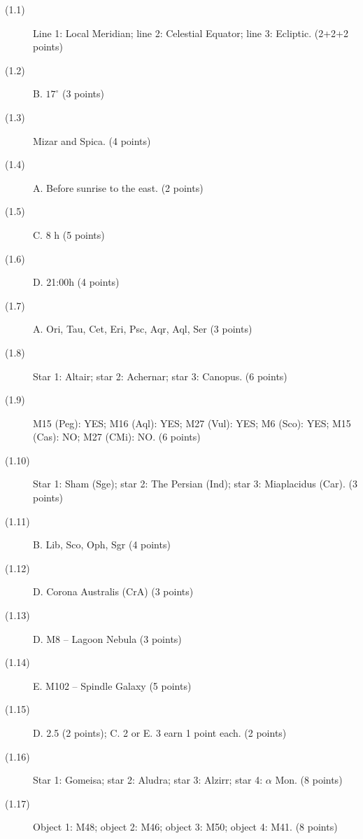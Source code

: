 \begin{description}
\item[(1.1)] Line 1: Local Meridian; line 2: Celestial Equator; line 3:
  Ecliptic. \hfill(2+2+2 points)
\item[(1.2)] B. $17^\circ$ \hfill(3 points)
\item[(1.3)] Mizar and Spica. \hfill(4 points)
\item[(1.4)] A. Before sunrise to the east. \hfill(2 points)
\item[(1.5)] C. 8 h \hfill(5 points)
\item[(1.6)] D. 21:00h \hfill(4 points)
\item[(1.7)] A. Ori, Tau, Cet, Eri, Psc, Aqr, Aql, Ser \hfill(3 points)
\item[(1.8)] Star 1: Altair; star 2: Achernar; star 3: Canopus.
  \hfill(6 points)
\item[(1.9)] M15 (Peg): YES; M16 (Aql): YES; M27 (Vul): YES; M6 (Sco):
  YES; M15 (Cas): NO; M27 (CMi): NO. \hfill(6 points)
\item[(1.10)] Star 1: Sham (Sge); star 2: The Persian (Ind); star 3:
  Miaplacidus (Car). \hfill(3 points)
\item[(1.11)] B. Lib, Sco, Oph, Sgr \hfill(4 points)
\item[(1.12)] D. Corona Australis (CrA) \hfill(3 points)
\item[(1.13)] D. M8 -- Lagoon Nebula \hfill(3 points)
\item[(1.14)] E. M102 -- Spindle Galaxy \hfill(5 points)
\item[(1.15)] D. 2.5 (2 points); C. 2 or E. 3 earn 1 point each.
  \hfill(2 points)
\item[(1.16)] Star 1: Gomeisa; star 2: Aludra; star 3: Alzirr; star 4:
  $\alpha$ Mon. \hfill(8 points)
\item[(1.17)] Object 1: M48; object 2: M46; object 3: M50; object 4: M41.
  \hfill(8 points)
\end{description}

